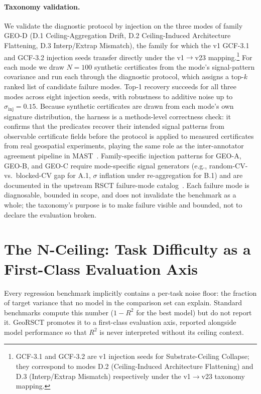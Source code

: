 \documentclass{article}
\begin{document}
\paragraph{Taxonomy validation.}
\label{sec:injection}
We validate the diagnostic protocol by injection on the three modes of family GEO-D (D.1 Ceiling-Aggregation Drift, D.2 Ceiling-Induced Architecture Flattening, D.3 Interp/Extrap Mismatch), the family for which the v1 GCF-3.1 and GCF-3.2 injection seeds transfer directly under the v1$\to$v23 mapping.\footnote{GCF-3.1 and GCF-3.2 are v1 injection seeds for Substrate-Ceiling Collapse; they correspond to modes D.2 (Ceiling-Induced Architecture Flattening) and D.3 (Interp/Extrap Mismatch) respectively under the v1$\to$v23 taxonomy mapping.} For each mode we draw $N{=}100$ synthetic certificates from the mode's signal-pattern covariance and run each through the diagnostic protocol, which assigns a top-$k$ ranked list of candidate failure modes. Top-1 recovery succeeds for all three modes across eight injection seeds, with robustness to additive noise up to $\sigma_{\text{inj}}{=}0.15$. Because synthetic certificates are drawn from each mode's own signature distribution, the harness is a methods-level correctness check: it confirms that the predicates recover their intended signal patterns from observable certificate fields before the protocol is applied to measured certificates from real geospatial experiments, playing the same role as the inter-annotator agreement pipeline in MAST~\citep{cemri2025mast}. Family-specific injection patterns for GEO-A, GEO-B, and GEO-C require mode-specific signal generators (e.g., random-CV-vs.\ blocked-CV gap for A.1, $\sigma$ inflation under re-aggregation for B.1) and are documented in the upstream RSCT failure-mode catalog~\citep{martin2026rsct}. Each failure mode is diagnosable, bounded in scope, and does not invalidate the benchmark as a whole; the taxonomy's purpose is to make failure visible and bounded, not to declare the evaluation broken.

\section{The N-Ceiling: Task Difficulty as a First-Class Evaluation Axis}
\label{sec:nceiling}

Every regression benchmark implicitly contains a per-task noise floor: the fraction of target variance that no model in the comparison set can explain. Standard benchmarks compute this number ($1{-}R^2$ for the best model) but do not report it. GeoRSCT promotes it to a first-class evaluation axis, reported alongside model performance so that $R^2$ is never interpreted without its ceiling context.
\end{document}
